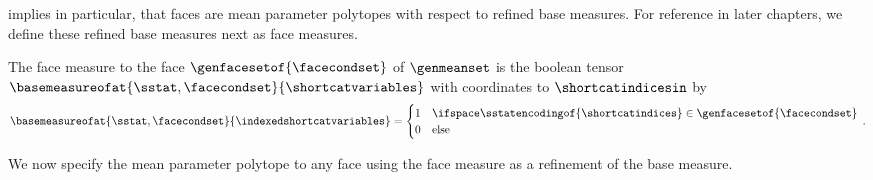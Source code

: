  implies in particular, that faces are mean parameter polytopes with respect to refined base measures.
For reference in later chapters, we define these refined base measures next as face measures.

\begin{definition}
    \label{def:faceMeasure}
    The face measure to the face $\genfacesetof{\facecondset}$ of $\genmeanset$ is the boolean tensor $\basemeasureofat{\sstat,\facecondset}{\shortcatvariables}$ with coordinates to $\shortcatindicesin$ by
    \begin{align*}
        \basemeasureofat{\sstat,\facecondset}{\indexedshortcatvariables}
        = \begin{cases}
              1 & \ifspace \sstatencodingof{\shortcatindices}\in\genfacesetof{\facecondset} \\
              0 & \text{else}
        \end{cases} \, .
    \end{align*}
\end{definition}

We now specify the mean parameter polytope to any face using the face measure as a refinement of the base measure.

